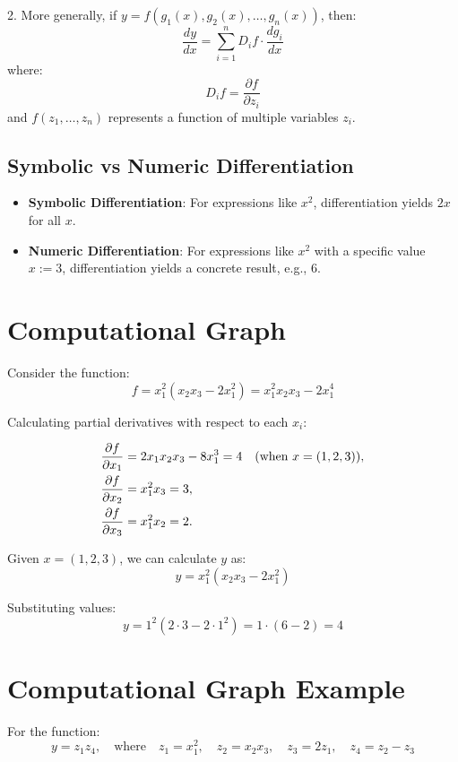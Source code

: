 \documentclass{article}
\begin{document}
2. More generally, if \( y = f(g_1(x), g_2(x), \dots, g_n(x)) \), then:
   \[
   \frac{dy}{dx} = \sum_{i=1}^{n} D_i f \cdot \frac{dg_i}{dx}
   \]
   where:
   \[
   D_i f = \frac{\partial f}{\partial z_i}
   \]
   and \( f(z_1, \dots, z_n) \) represents a function of multiple variables \( z_i \).

\subsection{Symbolic vs Numeric Differentiation}
\begin{itemize}
\item \textbf{Symbolic Differentiation}: For expressions like \( x^2 \), differentiation yields \( 2x \) for all \( x \).

\item \textbf{Numeric Differentiation}: For expressions like \( x^2 \) with a specific value \( x := 3 \), differentiation yields a concrete result, e.g., \( 6 \).
\end{itemize}

\section{Computational Graph}

Consider the function:
\[
f = x_1^2 (x_2 x_3 - 2 x_1^2) = x_1^2 x_2 x_3 - 2 x_1^4
\]

Calculating partial derivatives with respect to each \( x_i \):

\begin{align*}
\frac{\partial f}{\partial x_1} &= 2 x_1 x_2 x_3 - 8 x_1^3 = 4 \quad \text{(when \( x = (1, 2, 3) \))}, \\
\frac{\partial f}{\partial x_2} &= x_1^2 x_3 = 3, \\
\frac{\partial f}{\partial x_3} &= x_1^2 x_2 = 2.
\end{align*}

Given \( x = (1, 2, 3) \), we can calculate \( y \) as:
\[
y = x_1^2 (x_2 x_3 - 2 x_1^2)
\]

Substituting values:
\[
y = 1^2 (2 \cdot 3 - 2 \cdot 1^2) = 1 \cdot (6 - 2) = 4
\]


\section{Computational Graph Example}

For the function:
\[
y = z_1 z_4, \quad \text{where} \quad z_1 = x_1^2, \quad z_2 = x_2 x_3, \quad z_3 = 2 z_1, \quad z_4 = z_2 - z_3
\]
\end{document}
